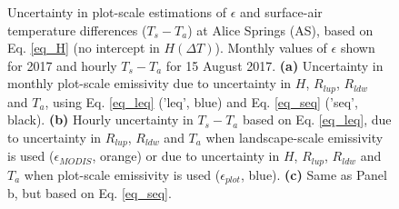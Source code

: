 \documentclass[fleqn,10pt]{wlscirep}
\begin{document}
{{\begin{figure}[h!]

\setlength{\belowcaptionskip}{-3ex}
\caption{Uncertainty in plot-scale estimations of $\epsilon$ and surface-air temperature differences ($T_{s} - T_{a}$) at Alice Springs (AS), based on Eq. \ref{eq_H} (no intercept in $H(\Delta T)$). Monthly values of $\epsilon$ shown for 2017 and hourly $T_{s} - T_{a}$ for 15 August 2017. \textbf{(a)} Uncertainty in monthly plot-scale emissivity due to uncertainty in $H$, $R_{lup}$, $R_{ldw}$ and $T_{a}$, using Eq. \ref{eq_leq} ('leq', blue)  and Eq. \ref{eq_seq} ('seq', black). \textbf{(b)} Hourly uncertainty in $T_{s} - T_{a}$ based on Eq. \ref{eq_leq}, due to uncertainty in $R_{lup}$, $R_{ldw}$ and $T_{a}$ when landscape-scale emissivity is used ($\epsilon_{MODIS}$, orange) or due to uncertainty in $H$, $R_{lup}$, $R_{ldw}$ and $T_{a}$ when plot-scale emissivity is used ($\epsilon_{plot}$, blue). \textbf{(c)} Same as Panel b, but based on Eq. \ref{eq_seq}. 
}
\label{fig:eps_unc1}
\end{figure}

}}
\end{document}
